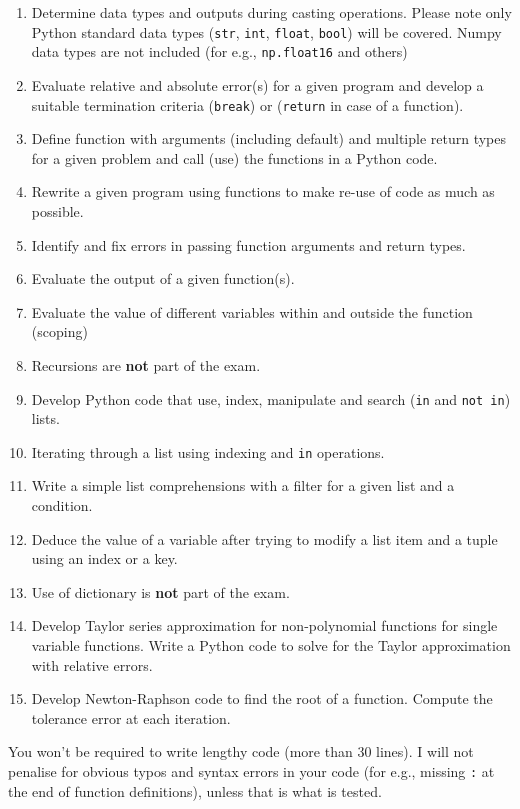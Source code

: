 \documentclass[]{article}
\begin{document}
\begin{enumerate}
	\item Determine data types and outputs during casting operations. Please note only Python standard data types (\verb|str|, \verb|int|, \verb|float|, \verb|bool|) will be covered. Numpy data types are not included (for e.g., \verb|np.float16| and others)
	\item Evaluate relative and absolute error(s) for a given program and develop  a suitable termination criteria (\verb|break|) or (\verb|return| in case of a function).
	\item Define function with arguments (including default) and multiple return types for a given problem and call (use) the functions in a Python code.
	\item Rewrite a given program using functions to make re-use of code as much as possible.
\item Identify and fix errors in passing function arguments and return types.
	\item Evaluate the output of a given function(s).
	\item Evaluate the value of different variables within and outside the function (scoping)
	\item Recursions are \textbf{not} part of the exam.
	\item Develop Python code that use, index, manipulate and search (\verb|in| and \verb|not in|) lists.
	\item Iterating through a list using indexing and \verb|in| operations.
	\item Write a simple list comprehensions with a filter for a given list and a condition.
	\item Deduce the value of a variable after trying to modify a list item and a tuple using an index or a key.
	\item Use of dictionary is \textbf{not} part of the exam.
	\item Develop Taylor series approximation for non-polynomial functions for single variable functions. Write a Python code to solve for the Taylor approximation with relative errors.
	\item Develop Newton-Raphson code to find the root of a function. Compute the tolerance error at each iteration.


\end{enumerate}

You won't be required to write lengthy code (more than 30 lines). I will not penalise for obvious typos and syntax errors in your code (for e.g., missing \verb|:| at the end of function definitions), unless that is what is tested.
\end{document}
